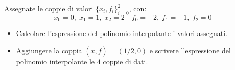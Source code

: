 Assegnate le coppie di valori $\{x_i,f_i \}_{i=0}^2$, con:
\[
x_0=0, \; x_1=1, \; x_2=2 \quad f_0=-2, \; f_1=-1, \; f_2=0
\]
\begin{itemize}
\item  Calcolare l'espressione del polinomio interpolante i
valori assegnati.
\item
Aggiungere la coppia $(\overline{x},\overline{f})=(1/2,0)$ e
scrivere l'espressione del polinomio interpolante le $4$ coppie
di dati.

\end{itemize}
